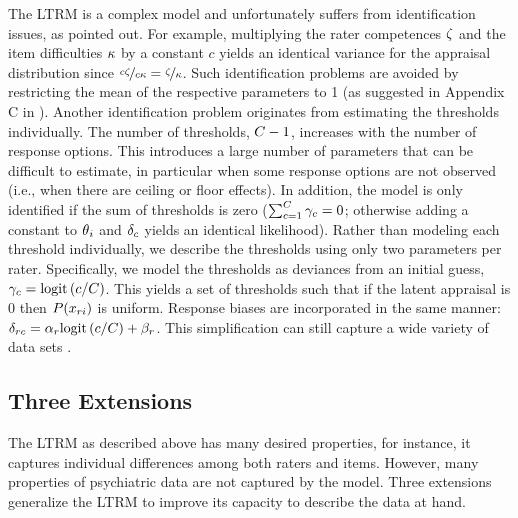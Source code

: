 \documentclass[a4paper,usenames,dvipsnames]{article}
\begin{document}
The LTRM is a complex model and unfortunately suffers from identification issues, as \AB{} pointed out. For example, multiplying the rater competences $\zeta$ and the item difficulties $\kappa$ by a constant $c$ yields an identical variance for the appraisal distribution since $\nicefrac{c\zeta}{c\kappa} = \nicefrac{\zeta}{\kappa}$. Such identification problems are avoided by restricting the mean of the respective parameters to 1 (as suggested in Appendix C in \AB{}).
Another identification problem originates from estimating the thresholds individually. The number of thresholds, $\Tncat-1$, increases with the number of response options. This introduces a large number of parameters that can be difficult to estimate, in particular when some response options are not observed (i.e., when there are ceiling or floor effects). In addition, the model is only identified if the sum of thresholds is zero ($\sum_{\Incat=1}^{\Tncat}\UnBiasedThreshold_\Incat = 0$; otherwise adding a constant to $\theta{}_i$ and $\delta_c$ yields an identical likelihood). Rather than modeling each threshold individually, we describe the thresholds using only two parameters per rater. Specifically, we model the thresholds as deviances from an initial guess, $\gamma_c = \text{logit}\left(c/C\right)$. This yields a set of thresholds such that if the latent appraisal is 0 then $P(x_{ri})$ is uniform. Response biases are incorporated in the same manner: $\delta_{rc} = \alpha_r\text{logit}\left(c/C\right) + \beta_r$. This simplification can still capture a wide variety of data sets \cite{Selker2019}. 

\subsection*{Three Extensions}

The LTRM as described above has many desired properties, for instance, it captures individual differences among both raters and items. However, many properties of psychiatric data are not captured by the model. Three extensions generalize the LTRM to improve its capacity to describe the data at hand.
\end{document}
